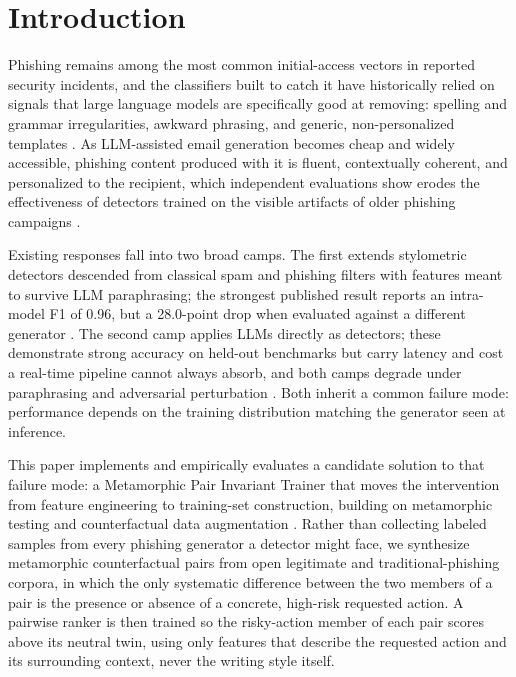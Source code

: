\documentclass[conference]{IEEEtran}
\begin{document}
\section{Introduction}

Phishing remains among the most common initial-access vectors in reported security incidents, and the classifiers built to catch it have historically relied on signals that large language models are specifically good at removing: spelling and grammar irregularities, awkward phrasing, and generic, non-personalized templates \cite{S14}. As LLM-assisted email generation becomes cheap and widely accessible, phishing content produced with it is fluent, contextually coherent, and personalized to the recipient, which independent evaluations show erodes the effectiveness of detectors trained on the visible artifacts of older phishing campaigns \cite{S1,S5}.

Existing responses fall into two broad camps. The first extends stylometric detectors descended from classical spam and phishing filters \cite{sahami1998bayesian,metsis2006enronspam,cormack2007trec,fette2007pilfer} with features meant to survive LLM paraphrasing; the strongest published result reports an intra-model F1 of 0.96, but a 28.0-point drop when evaluated against a different generator \cite{S1}. The second camp applies LLMs directly as detectors; these demonstrate strong accuracy on held-out benchmarks \cite{S7,S8,otieno2023bert} but carry latency and cost a real-time pipeline cannot always absorb, and both camps degrade under paraphrasing and adversarial perturbation \cite{S2,jin2020textfooler}. Both inherit a common failure mode: performance depends on the training distribution matching the generator seen at inference.

This paper implements and empirically evaluates a candidate solution to that failure mode: a Metamorphic Pair Invariant Trainer that moves the intervention from feature engineering to training-set construction, building on metamorphic testing \cite{chen2018metamorphic,segura2016survey} and counterfactual data augmentation \cite{kaushik2020counterfactual,qiu2024paircfr}. Rather than collecting labeled samples from every phishing generator a detector might face, we synthesize metamorphic counterfactual pairs from open legitimate and traditional-phishing corpora, in which the only systematic difference between the two members of a pair is the presence or absence of a concrete, high-risk requested action. A pairwise ranker is then trained so the risky-action member of each pair scores above its neutral twin, using only features that describe the requested action and its surrounding context, never the writing style itself.
\end{document}
